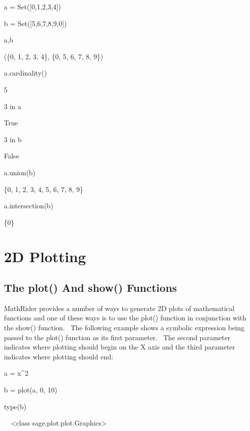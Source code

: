 \documentclass[12pt,twoside]{book}
\begin{document}
\bigskip

a = Set([0,1,2,3,4])

b = Set([5,6,7,8,9,0])

a,b

{\textbar}

(\{0, 1, 2, 3, 4\}, \{0, 5, 6, 7, 8, 9\})


\bigskip

a.cardinality()

{\textbar}

5


\bigskip

3 in a

{\textbar}

True


\bigskip

3 in b

{\textbar}

False


\bigskip

a.union(b)

{\textbar}

\{0, 1, 2, 3, 4, 5, 6, 7, 8, 9\}


\bigskip

a.intersection(b)

{\textbar}

\{0\}

\chapter[2D Plotting]{2D Plotting}
\section[The plot() And show() Functions]{The plot() And
show() Functions}
MathRider provides a number of ways to generate 2D plots of mathematical
functions and one of these ways is to use the plot() function in
conjunction with the show() function. \ The following example shows a
symbolic expression being passed to the plot() function as its first
parameter. \ The second parameter indicates where plotting should begin
on the X axis and the third parameter indicates where plotting should
end:

a = x\^{}2

b = plot(a, 0, 10)

type(b)

{\textbar}

\ \ {\textless}class
{\textquotesingle}sage.plot.plot.Graphics{\textquotesingle}{\textgreater}
\end{document}
